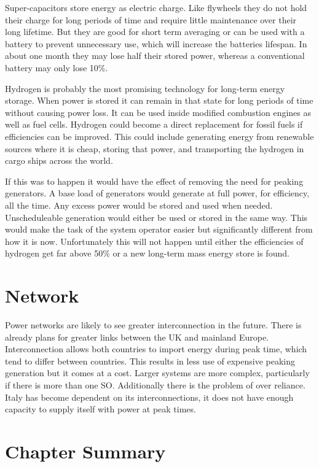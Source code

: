 \documentclass[a4paper,oneside,12pt]{report}
\begin{document}
Super-capacitors store energy as electric charge. Like flywheels they do not hold their charge for long periods of time and require little maintenance over their long lifetime. But they are good for short term averaging or can be used with a battery to prevent unnecessary use, which will increase the batteries lifespan. In about one month they may lose half their stored power, whereas a conventional battery may only lose 10\%.

Hydrogen is probably the most promising technology for long-term energy storage. When power is stored it can remain in that state for long periods of time without causing power loss. It can be used inside modified combustion engines as well as fuel cells. Hydrogen could become a direct replacement for fossil fuels if efficiencies can be improved. This could include generating energy from renewable sources where it is cheap, storing that power, and transporting the hydrogen in cargo ships across the world.

If this was to happen it would have the effect of removing the need for peaking generators. A base load of generators would generate at full power, for efficiency, all the time. Any excess power would be stored and used when needed. Unscheduleable generation would either be used or stored in the same way. This would make the task of the system operator easier but significantly different from how it is now. Unfortunately this will not happen until either the efficiencies of hydrogen get far above 50\% or a new long-term mass energy store is found.


\section{Network}

Power networks are likely to see greater interconnection in the future. There is already plans for greater links between the UK and mainland Europe. Interconnection allows both countries to import energy during peak time, which tend to differ between countries. This results in less use of expensive peaking generation but it comes at a cost. Larger systems are more complex, particularly if there is more than one SO. Additionally there is the problem of over reliance. Italy has become dependent on its interconnections, it does not have enough capacity to supply itself with power at peak times.

\section{Chapter Summary}
\end{document}
